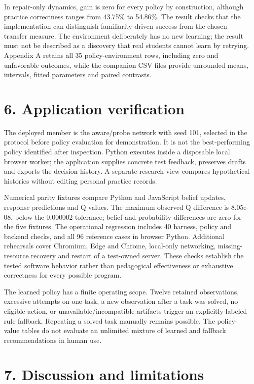 \documentclass[preprint,11pt,authoryear]{elsarticle}
\begin{document}
In repair-only dynamics, gain is zero for every policy by construction, although practice correctness ranges from 43.75\% to 54.86\%. The result checks that the implementation can distinguish familiarity-driven success from the chosen transfer measure. The environment deliberately has no new learning; the result must not be described as a discovery that real students cannot learn by retrying. Appendix A retains all 35 policy-environment rows, including zero and unfavorable outcomes, while the companion CSV files provide unrounded means, intervals, fitted parameters and paired contrasts.

\section*{6. Application verification}

The deployed member is the aware/probe network with seed 101, selected in the protocol before policy evaluation for demonstration. It is not the best-performing policy identified after inspection. Python executes inside a disposable local browser worker; the application supplies concrete test feedback, preserves drafts and exports the decision history. A separate research view compares hypothetical histories without editing personal practice records.

Numerical parity fixtures compare Python and JavaScript belief updates, response predictions and Q values. The maximum observed Q difference is 8.05e-08, below the 0.000002 tolerance; belief and probability differences are zero for the five fixtures. The operational regression includes 40 harness, policy and backend checks, and all 96 reference cases in browser Python. Additional rehearsals cover Chromium, Edge and Chrome, local-only networking, missing-resource recovery and restart of a test-owned server. These checks establish the tested software behavior rather than pedagogical effectiveness or exhaustive correctness for every possible program.

The learned policy has a finite operating scope. Twelve retained observations, excessive attempts on one task, a new observation after a task was solved, no eligible action, or unavailable/incompatible artifacts trigger an explicitly labeled rule fallback. Repeating a solved task manually remains possible. The policy-value tables do not evaluate an unlimited mixture of learned and fallback recommendations in human use.

\section*{7. Discussion and limitations}
\end{document}
